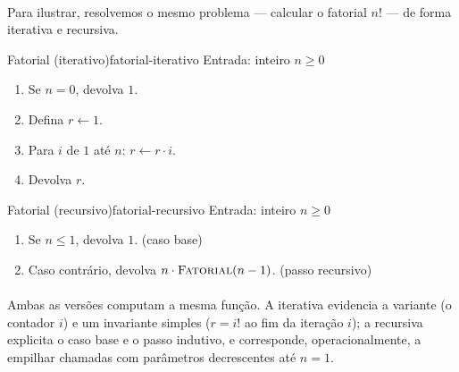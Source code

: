 \documentclass[12pt,a4paper]{article}
\def\emph#1{#1}%
\begin{document}
\paragraph{}
Para ilustrar, resolvemos o mesmo problema — calcular o fatorial \(n!\) — de forma \emph{iterativa} e \emph{recursiva}.

\begin{algobox}{Fatorial (iterativo)}{fatorial-iterativo}
    Entrada: inteiro \(n\ge 0\)
    \begin{enumerate}\setlength{\itemsep}{2pt}
        \item Se \(n=0\), devolva \(1\).
        \item Defina \(r\leftarrow 1\).
        \item Para \(i\) de \(1\) até \(n\): \(r\leftarrow r\cdot i\).
        \item Devolva \(r\).
    \end{enumerate}
\end{algobox}

\begin{algobox}{Fatorial (recursivo)}{fatorial-recursivo}
    Entrada: inteiro \(n\ge 0\)
    \begin{enumerate}\setlength{\itemsep}{2pt}
        \item Se \(n\le 1\), devolva \(1\). \hfill (caso base)
        \item Caso contrário, devolva \(n\cdot \textsc{Fatorial}(n-1)\). \hfill (passo recursivo)
    \end{enumerate}
\end{algobox}

\paragraph{}
Ambas as versões computam a mesma função. A iterativa evidencia a \emph{variante} (o contador \(i\)) e um \emph{invariante} simples (\(r= i!\) ao fim da iteração \(i\)); a recursiva explicita o \emph{caso base} e o \emph{passo indutivo}, e corresponde, operacionalmente, a empilhar chamadas com parâmetros decrescentes até \(n=1\).
\end{document}
